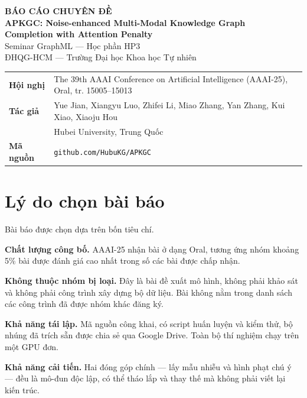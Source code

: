 \documentclass[11pt,a4paper]{article}
\begin{document}
\begin{center}
  {\sffamily\LARGE\bfseries\color{hcmusblue} BÁO CÁO CHUYÊN ĐỀ}\\[8pt]
  {\sffamily\large\bfseries APKGC: Noise-enhanced Multi-Modal Knowledge Graph\\
   Completion with Attention Penalty}\\[10pt]
  {\small Seminar GraphML --- Học phần HP3}\\[2pt]
  {\small ĐHQG-HCM --- Trường Đại học Khoa học Tự nhiên}
\end{center}

\vspace{4pt}
\begin{center}\small
\begin{tabular}{@{}ll@{}}
  \toprule
  \textbf{Hội nghị} & The 39th AAAI Conference on Artificial Intelligence
                      (AAAI-25), Oral, tr. 15005--15013\\
  \textbf{Tác giả}  & Yue Jian, Xiangyu Luo, Zhifei Li, Miao Zhang, Yan Zhang,
                      Kui Xiao, Xiaoju Hou\\
                    & Hubei University, Trung Quốc\\
  \textbf{Mã nguồn} & \texttt{github.com/HubuKG/APKGC}\\
  \bottomrule
\end{tabular}
\end{center}

\vspace{6pt}
\section{Lý do chọn bài báo}
Bài báo được chọn dựa trên bốn tiêu chí.

\textbf{Chất lượng công bố.} AAAI-25 nhận bài ở dạng Oral, tương ứng nhóm khoảng 5\% bài được đánh giá cao nhất trong số các bài được chấp nhận.

\textbf{Không thuộc nhóm bị loại.} Đây là bài đề xuất mô hình, không phải khảo sát và không phải công trình xây dựng bộ dữ liệu. Bài không nằm trong danh sách các công trình đã được nhóm khác đăng ký.

\textbf{Khả năng tái lập.} Mã nguồn công khai, có script huấn luyện và kiểm thử, bộ nhúng đã trích sẵn được chia sẻ qua Google Drive. Toàn bộ thí nghiệm chạy trên một GPU đơn.

\textbf{Khả năng cải tiến.} Hai đóng góp chính --- lấy mẫu nhiễu và hình phạt chú ý --- đều là mô-đun độc lập, có thể tháo lắp và thay thế mà không phải viết lại kiến trúc.
\end{document}
